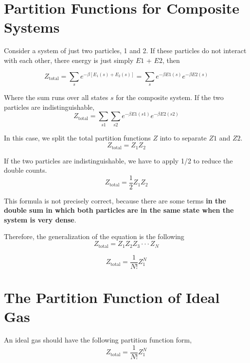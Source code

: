 
\section{Partition Functions for Composite Systems}
Consider a system of just two particles, 1 and 2. If these particles do not interact with each other, there 
energy is just simply $E1$ + $E2$, then

\begin{equation}
Z_\text{total} = \sum_{s} e^{-\beta[E_1(s)+E_2(s)]} = \sum_{s} e^{-\beta E1(s)} e^{-\beta E2(s)}
\end{equation}
 
Where the sum runs over all states $s$ for the composite system. If the two particles are indistinguishable,
\begin{equation}
Z_\text{total} = \sum_{s1}\sum_{s2} e^{-\beta E1(s1)} e^{-\beta E2(s2)}
\end{equation}
 
In this case, we split the total partition functions $Z$ into to separate $Z1$ and $Z2$.
\begin{equation}
Z_\text{total} = Z_1Z_2
\end{equation}
 
If the two particles are indistinguishable, we have to apply 1/2 to reduce the double counts.
\begin{equation}
Z_\text{total} = \frac{1}{2}Z_1Z_2
\end{equation}

This formula is not precisely correct, because there are some terms {\bf in the double sum in which both particles are in the same state 
when the system is very dense}. 

Therefore, the generalization of the equation is the following
\begin{equation}
Z_\text{total} = Z_1Z_2Z_3\cdot\cdot\cdot Z_N
\end{equation}

\begin{equation}
Z_\text{total} = \frac{1}{N!}Z_1^N
\end{equation}

\section{The Partition Function of Ideal Gas}
An ideal gas should have the following partition function form,
\begin{equation}
Z_\text{total} = \frac{1}{N!}Z_1^N
\end{equation}

